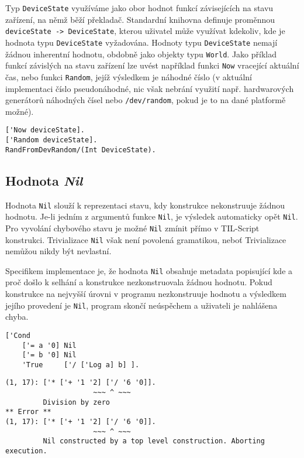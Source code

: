 Typ \lstinline{DeviceState} využíváme jako obor hodnot funkcí závisejících na stavu zařízení,
na němž běží překladač. Standardní knihovna definuje proměnnou
\lstinline{deviceState -> DeviceState}, kterou uživatel může využívat kdekoliv, kde je hodnota typu
\lstinline{DeviceState} vyžadována. Hodnoty typu \lstinline{DeviceState} nemají žádnou inherentní
hodnotu, obdobně jako objekty typu \lstinline{World}. Jako příklad funkcí závislých na stavu
zařízení lze uvést například funkci \lstinline{Now} vracející aktuální čas, nebo funkci
\lstinline{Random}, jejíž výsledkem je náhodné číslo (v aktuální implementaci číslo pseudonáhodné,
nic však nebrání využití např. hardwarových generátorů náhodných čísel nebo
\lstinline{/dev/random}, pokud je to na dané platformě možné).

\begin{lstlisting}[caption={Příklad funkcí závislých na stavu zařízení}]
['Now deviceState].
['Random deviceState].
RandFromDevRandom/(Int DeviceState).
\end{lstlisting}

\subsection{Hodnota \textit{Nil}} \label{nil-value}

Hodnota \lstinline{Nil} slouží k reprezentaci stavu, kdy konstrukce nekonstruuje žádnou hodnotu.
Je-li jedním z argumentů funkce \lstinline{Nil}, je výsledek automaticky opět \lstinline{Nil}.
Pro vyvolání chybového stavu je možné \lstinline{Nil} zmínit přímo v TIL-Script konstrukci.
Trivializace \lstinline{Nil} však není povolená gramatikou, neboť Trivializace nemůžou nikdy
být nevlastní.

Specifikem implementace je, že hodnota \lstinline{Nil} obsahuje metadata popisující kde a proč
došlo k selhání a konstrukce nezkonstruovala žádnou hodnotu. Pokud konstrukce na nejvyšší úrovni
v programu nezkonstruuje hodnotu a výsledkem jejího provedení je \lstinline{Nil}, program skončí
neúspěchem a uživateli je nahlášena chyba.

\begin{lstlisting}[caption={Příklad využití Nil}]
['Cond
    ['= a '0] Nil
    ['= b '0] Nil
    'True     ['/ ['Log a] b] ].
\end{lstlisting}

\begin{lstlisting}[caption={Příklad hlášení chyby}]
(1, 17): ['* ['+ '1 '2] ['/ '6 '0]].
                     ~~~ ^ ~~~
         Division by zero
** Error **
(1, 17): ['* ['+ '1 '2] ['/ '6 '0]].
                     ~~~ ^ ~~~
         Nil constructed by a top level construction. Aborting execution.
\end{lstlisting}

